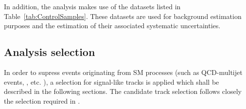 In addition, the analysis makes use of the datasets listed in Table~\ref{tab:ControlSamples}.
These datasets are used for background estimation purposes and the estimation of their associated systematic uncertainties.
\renewcommand{\arraystretch}{1.5}
\begin{table}[!hbt]
\centering
\caption{Further datasets used for background estimation.}
\label{tab:ControlSamples}
\end{table}  
\subsection{Analysis selection}

In order to supress events originating from SM processes (such as QCD-multijet events, \WJets, etc. ), a selection for signal-like tracks is applied which shall be described in the following sections.
The candidate track selection follows closely the selection required in \cite{bib:CMS:DT_8TeV}.\\

